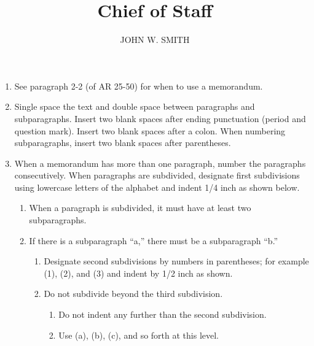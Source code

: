 \documentclass{../armymemo}
\author{JOHN W. SMITH}\rank{Colonel}\branch{GS}\title{Chief of Staff}
\begin{document}
\begin{enumerate}
\item See paragraph 2-2 (of AR 25-50) for when to use a memorandum.
\item Single space the text and double space between paragraphs and subparagraphs. Insert two blank spaces after ending punctuation (period and question mark). Insert two blank spaces after a colon. When numbering subparagraphs, insert two blank spaces after parentheses.
\item When a memorandum has more than one paragraph, number the paragraphs consecutively. When paragraphs are subdivided, designate first subdivisions using lowercase letters of the alphabet and indent 1/4 inch as shown below.
  \begin{enumerate}
  \item When a paragraph is subdivided, it must have at least two subparagraphs.
  \item If there is a subparagraph ``a,'' there must be a subparagraph ``b.''
    \begin{enumerate}
    \item Designate second subdivisions by numbers in parentheses; for example (1), (2), and (3) and indent by 1/2 inch as shown.
    \item Do not subdivide beyond the third subdivision.
      \begin{enumerate}
      \item Do not indent any further than the second subdivision.
      \item Use (a), (b), (c), and so forth at this level.
      \end{enumerate}
    \end{enumerate}
  \end{enumerate}
\end{enumerate}
\end{document}

